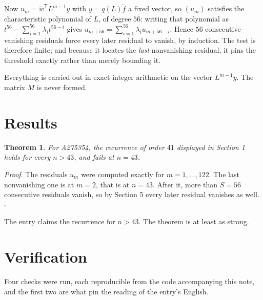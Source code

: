 \documentclass[11pt]{article}
\newtheorem{theorem}{Theorem}
\theoremstyle{definition}
\begin{document}
Now $u_m = \tilde w^{\mathsf T} L^{m-1} y$ with $y = q(L)\tilde f$ a fixed vector, so $(u_m)$ satisfies the characteristic polynomial of $L$, of degree $56$: writing that polynomial as $t^{56} - \sum_{i=1}^{56} \lambda_i t^{56-i}$ gives $u_{m+56} = \sum_{i=1}^{56} \lambda_i u_{m+56-i}$. Hence $56$ consecutive vanishing residuals force every later residual to vanish, by induction. The test is therefore finite; and because it locates the {\itshape last} nonvanishing residual, it pins the threshold exactly rather than merely bounding it.

Everything is carried out in exact integer arithmetic on the vector $L^{m-1}y$. The matrix $M$ is never formed.

\section{Results}

\begin{theorem} For A275354, the recurrence of order $41$ displayed in Section 1 holds for every $n > 43$, and fails at $n = 43$.\end{theorem}

{\itshape Proof.} The residuals $u_m$ were computed exactly for $m = 1,\dots,122$. The last nonvanishing one is at $m = 2$, that is at $n = 43$. After it, more than $S = 56$ consecutive residuals vanish, so by Section 5 every later residual vanishes as well. $\square$

The entry claims the recurrence for $n > 43$. The theorem is at least as strong.

\section{Verification}

Four checks were run, each reproducible from the code accompanying this note, and the first two are what pin the reading of the entry's English.
\end{document}
